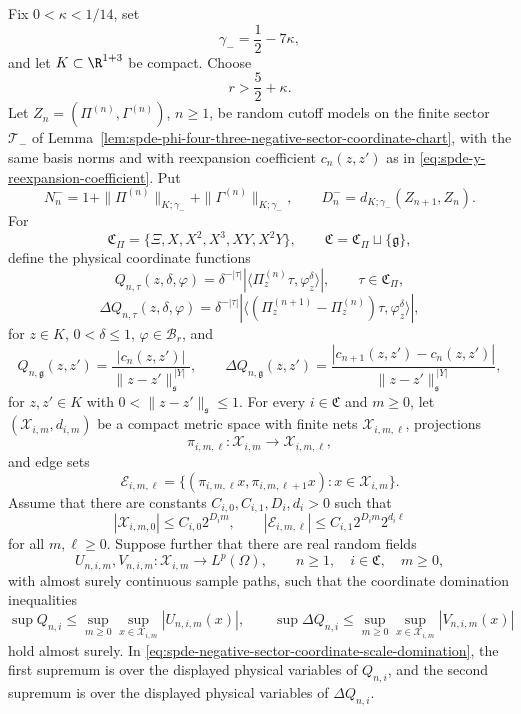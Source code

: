 \begin{hypothesis}
\label{hyp:spde-negative-sector-scale-summed-coordinate-scheme}
Fix \(0<\kappa<1/14\), set
\[
  \gamma_-=\frac12-7\kappa,
\]
and let \(K\subset\R^{1+3}\) be compact.  Choose
\[
  r>\frac52+\kappa .
\]
Let \(Z_n=(\Pi^{(n)},\Gamma^{(n)})\), \(n\geq1\), be random cutoff models on
the finite sector \(\mathcal T_-\) of
Lemma~\ref{lem:spde-phi-four-three-negative-sector-coordinate-chart},
with the same basis norms and with reexpansion coefficient \(c_n(z,z')\) as in
\eqref{eq:spde-y-reexpansion-coefficient}.  Put
\[
  N_n^-
  =
  1+\|\Pi^{(n)}\|_{K;\gamma_-}
   +\|\Gamma^{(n)}\|_{K;\gamma_-},
  \qquad
  D_n^-=d_{K;\gamma_-}(Z_{n+1},Z_n).
\]
For
\[
  \mathfrak C_\Pi=\{\Xi,X,X^2,X^3,XY,X^2Y\},
  \qquad
  \mathfrak C=\mathfrak C_\Pi\sqcup\{\mathfrak g\},
\]
define the physical coordinate functions
\[
  Q_{n,\tau}(z,\delta,\varphi)
  =
  \delta^{-|\tau|}
  \left|
    \langle\Pi_z^{(n)}\tau,\varphi_z^\delta\rangle
  \right|,
  \qquad \tau\in\mathfrak C_\Pi,
\]
\[
  \Delta Q_{n,\tau}(z,\delta,\varphi)
  =
  \delta^{-|\tau|}
  \left|
    \langle(\Pi_z^{(n+1)}-\Pi_z^{(n)})\tau,\varphi_z^\delta\rangle
  \right|,
\]
for \(z\in K\), \(0<\delta\leq1\), \(\varphi\in\mathcal B_r\), and
\[
  Q_{n,\mathfrak g}(z,z')
  =
  \frac{|c_n(z,z')|}
       {\|z-z'\|_{\mathfrak s}^{\,|Y|}},
  \qquad
  \Delta Q_{n,\mathfrak g}(z,z')
  =
  \frac{|c_{n+1}(z,z')-c_n(z,z')|}
       {\|z-z'\|_{\mathfrak s}^{\,|Y|}},
\]
for \(z,z'\in K\) with \(0<\|z-z'\|_{\mathfrak s}\leq1\).  For every
\(i\in\mathfrak C\) and \(m\geq0\), let \((\mathcal X_{i,m},d_{i,m})\) be a
compact metric space with finite nets \(\mathcal X_{i,m,\ell}\), projections
\[
  \pi_{i,m,\ell}:\mathcal X_{i,m}\to\mathcal X_{i,m,\ell},
\]
and edge sets
\[
  \mathcal E_{i,m,\ell}
  =
  \{(\pi_{i,m,\ell}x,\pi_{i,m,\ell+1}x):x\in\mathcal X_{i,m}\}.
\]
Assume that there are constants \(C_{i,0},C_{i,1},D_i,d_i>0\) such that
\begin{equation}
  |\mathcal X_{i,m,0}|\leq C_{i,0}2^{D_i m},
  \qquad
  |\mathcal E_{i,m,\ell}|\leq C_{i,1}2^{D_i m}2^{d_i\ell}
  \label{eq:spde-negative-sector-scale-entropy}
\end{equation}
for all \(m,\ell\geq0\).  Suppose further that there are real random fields
\[
  U_{n,i,m},V_{n,i,m}:\mathcal X_{i,m}\to L^p(\Omega),
  \qquad n\geq1,\quad i\in\mathfrak C,\quad m\geq0,
\]
with almost surely continuous sample paths, such that the coordinate
domination inequalities
\begin{equation}
  \sup Q_{n,i}
  \leq
  \sup_{m\geq0}\sup_{x\in\mathcal X_{i,m}}|U_{n,i,m}(x)|,
  \qquad
  \sup \Delta Q_{n,i}
  \leq
  \sup_{m\geq0}\sup_{x\in\mathcal X_{i,m}}|V_{n,i,m}(x)|
  \label{eq:spde-negative-sector-coordinate-scale-domination}
\end{equation}
hold almost surely.  In \eqref{eq:spde-negative-sector-coordinate-scale-domination},
the first supremum is over the displayed physical variables of \(Q_{n,i}\), and
the second supremum is over the displayed physical variables of
\(\Delta Q_{n,i}\).


\end{hypothesis}
